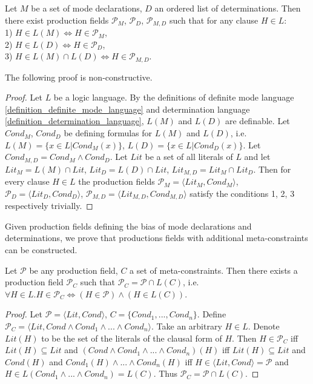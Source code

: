 \begin{proposition}\label{md_d_pf_correspondence_proposition}
Let $M$ be a set of mode declarations, $D$ an ordered list of determinations. Then there exist production fields
$\mathcal{P}_M$,
$\mathcal{P}_D$,
$\mathcal{P}_{M,D}$
such that for any clause $H \in L$:\\
1) $H \in L(M) \iff H \in \mathcal{P}_M$,\\
2) $H \in L(D) \iff H \in \mathcal{P}_D$,\\
3) $H \in L(M) \cap L(D) \iff H \in \mathcal{P}_{M,D}$.\\
\end{proposition}
The following proof is non-constructive.
\begin{proof}
Let $L$ be a logic language. By the definitions of definite mode language \ref{definition_definite_mode_language} and determination language \ref{definition_determination_language}, $L(M)$ and $L(D)$ are definable.
Let $Cond_M$, $Cond_D$ be defining formulas for $L(M)$ and $L(D)$, i.e. $L(M)=\{x \in L | Cond_M(x)\}$, $L(D)=\{x \in L | Cond_D(x)\}$.
Let $Cond_{M,D}=Cond_M \land Cond_D$. Let $Lit$ be a set of all literals of $L$ and let
$Lit_M=L(M) \cap Lit$,
$Lit_D=L(D) \cap Lit$,
$Lit_{M,D}=Lit_M \cap Lit_D$.
Then for every clause $H \in L$ the production fields
$\mathcal{P}_M=\langle Lit_M, Cond_M \rangle$,
$\mathcal{P}_D=\langle Lit_D, Cond_D \rangle$,
$\mathcal{P}_{M,D}=\langle Lit_{M,D}, Cond_{M,D} \rangle$
satisfy the conditions 1, 2, 3 respectively trivially.
\end{proof}

Given production fields defining the bias of mode declarations and determinations, we prove that productions fields with additional meta-constraints can be constructed.

\begin{proposition}\label{proposition_meta-constraints_production_field}
Let $\mathcal{P}$ be any production field, $C$ a set of meta-constraints.
Then there exists a production field $\mathcal{P}_C$ such that
$\mathcal{P}_C=\mathcal{P} \cap L(C)$, i.e.
$\forall H \in L. H \in \mathcal{P}_C \iff (H \in \mathcal{P}) \land (H \in L(C))$.
\end{proposition}
\begin{proof}
Let $\mathcal{P}=\langle Lit, Cond \rangle$,
$C=\{Cond_1, ..., Cond_n\}$.
Define $\mathcal{P}_C=\langle Lit, Cond \land Cond_1 \land ... \land Cond_n \rangle$. Take an arbitrary $H \in L$. Denote $Lit(H)$ to be the set of the literals of the clausal form of $H$.
Then $H \in \mathcal{P}_C$ iff $Lit(H) \subseteq Lit$ and
$(Cond \land Cond_1 \land ... \land Cond_n)(H)$ iff
$Lit(H) \subseteq Lit$ and $Cond(H)$ and $Cond_1(H) \land ... \land Cond_n(H)$
iff $H \in \langle Lit, Cond \rangle = \mathcal{P}$ and $H \in L(Cond_1 \land ... \land Cond_n) = L(C)$. Thus $\mathcal{P}_C=\mathcal{P} \cap L(C)$.
\end{proof}

